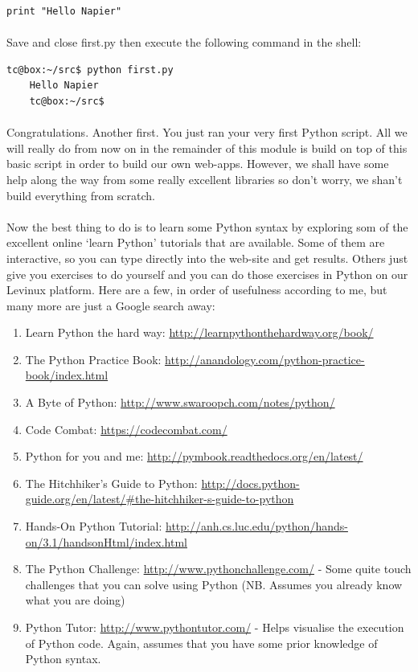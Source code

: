 \documentclass[12pt, a4paper, twoside]{book}
\begin{document}
\begin{lstlisting}
print "Hello Napier"
\end{lstlisting}

\paragraph{} Save and close first.py then execute the following command in the shell:

\begin{lstlisting}[style=DOS]
    tc@box:~/src$ python first.py 
    Hello Napier
    tc@box:~/src$
\end{lstlisting}

\paragraph{} Congratulations. Another first. You just ran your very first Python script. All we will really do from now on in the remainder of this module is build on top of this basic script in order to build our own web-apps. However, we shall have some help along the way from some really excellent libraries so don't worry, we shan't build everything from scratch.

\paragraph{} Now the best thing to do is to learn some Python syntax by exploring som of the excellent online `learn Python' tutorials that are available. Some of them are interactive, so you can type directly into the web-site and get results. Others just give you exercises to do yourself and you can do those exercises in Python on our Levinux platform. Here are a few, in order of usefulness according to me, but many more are just a Google search away:

\begin{enumerate}
\item Learn Python the hard way: \url{http://learnpythonthehardway.org/book/}
\item The Python Practice Book: \url{http://anandology.com/python-practice-book/index.html}
\item A Byte of Python: \url{http://www.swaroopch.com/notes/python/}
\item Code Combat: \url{https://codecombat.com/}
\item Python for you and me: \url{http://pymbook.readthedocs.org/en/latest/}
\item The Hitchhiker's Guide to Python: \url{http://docs.python-guide.org/en/latest/#the-hitchhiker-s-guide-to-python}
\item Hands-On Python Tutorial: \url{http://anh.cs.luc.edu/python/hands-on/3.1/handsonHtml/index.html}
\item The Python Challenge: \url{http://www.pythonchallenge.com/} - Some quite touch challenges that you can solve using Python (NB. Assumes you already know what you are doing)
\item Python Tutor: \url{http://www.pythontutor.com/} - Helps visualise the execution of Python code. Again, assumes that you have some prior knowledge of Python syntax.
\end{enumerate}
\end{document}
